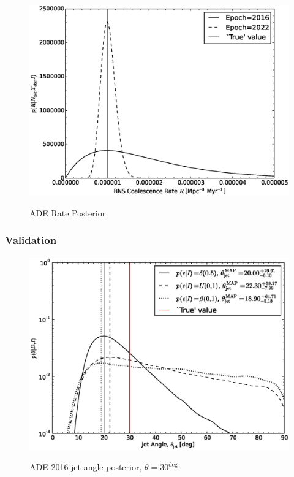 \documentclass[twocolumn,nofootinbib]{revtex4-1}
\begin{document}
\begin{figure}
\centering
{\includegraphics[width=\linewidth]{aligo_rate_re.eps}}
\caption{ADE Rate Posterior\label{fig:aligorate}}
\end{figure}


\subsubsection{Validation}

\begin{figure}
\centering
{\includegraphics[width=\linewidth]{jet_angle_posterior_aligo_2016.eps}}
\caption{ADE 2016 jet angle posterior, 
$\theta = 30^{\deg}$\label{fig:njjetposterio2016}}
\end{figure}
\end{document}
